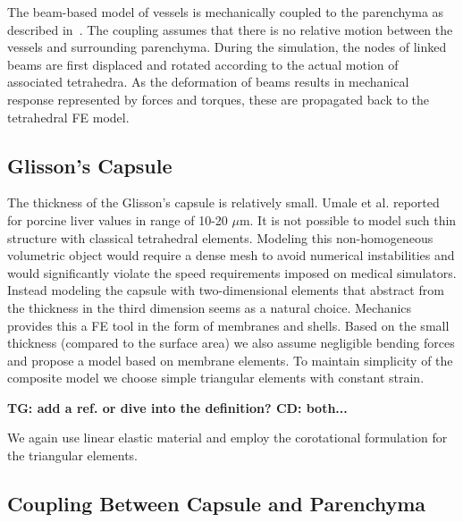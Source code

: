 \documentclass{llncs}
\newcommand{\TG}[1]{{\color{blue}\textbf{TG: #1}}}
\newcommand{\CD}[1]{{\color{green}\textbf{CD: #1}}}
\begin{document}
The beam-based model of vessels is mechanically coupled to the parenchyma as described in~\cite{peterlik2012}. 
The coupling assumes that there is no relative motion between the vessels and surrounding parenchyma. 
During the simulation, the nodes of linked beams are first displaced and rotated according to the actual motion of associated tetrahedra. 
As the deformation of beams results in mechanical response represented by forces and torques, these are propagated back to 
the tetrahedral FE model. 



\subsection{Glisson's Capsule} %

The thickness of the Glisson's capsule is relatively small. Umale et al.
\cite{Umale2011} reported for porcine liver values in range of 10-20
$\mu$m.
It is not possible to model such thin structure with classical tetrahedral
elements. Modeling this non-homogeneous volumetric object would require a
dense mesh to avoid numerical instabilities and would significantly
violate the speed requirements imposed on medical simulators.
Instead modeling the capsule with two-dimensional elements that abstract from the
thickness in the third dimension seems
as a natural choice. Mechanics provides this a FE tool in the form of membranes
and shells. Based on the small thickness (compared to the surface area) we also
assume negligible bending forces and propose a model based on membrane
elements. 
To maintain simplicity of the composite model we choose simple triangular
elements with constant strain.

\TG{add a ref. or dive into the definition? \cite{Felippa2003}} \CD{both...}

We again use linear elastic material and employ the corotational formulation
for the triangular elements.


\subsection{Coupling Between Capsule and Parenchyma} %
\end{document}

